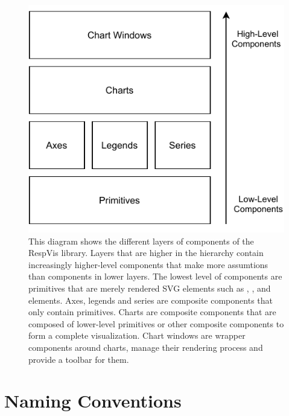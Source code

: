 \begin{figure}[tp]
\centering
\includegraphics[keepaspectratio,width=\linewidth,height=\fullh / 3]{diagrams/respvis-layers.pdf}
\caption[Component Layers of RespVis]{
  This diagram shows the different layers of components of the RespVis library.
  Layers that are higher in the hierarchy contain increasingly higher-level components that make more assumtions than components in lower layers.
  The lowest level of components are primitives that are merely rendered SVG elements such as , , and  elements.
  Axes, legends and series are composite components that only contain primitives.
  Charts are composite components that are composed of lower-level primitives or other composite components to form a complete visualization.
  Chart windows are wrapper components around charts, manage their rendering process and provide a toolbar for them.  
}
\label{fig:Layers}
\end{figure}

\section{Naming Conventions}
\label{sec:NamingConventions}

